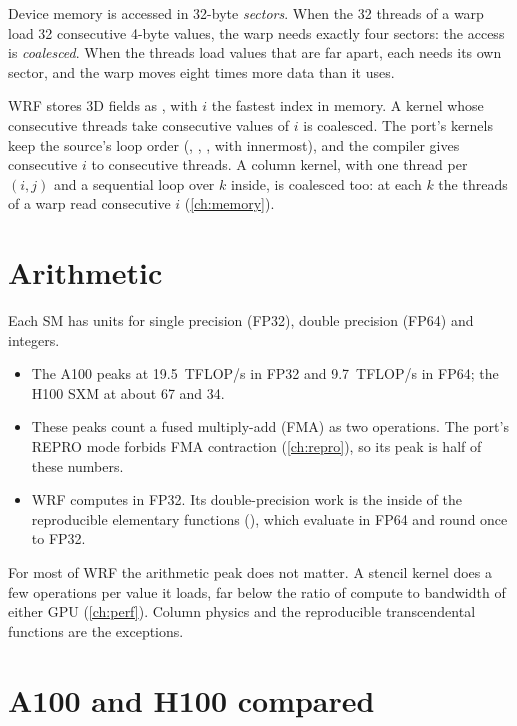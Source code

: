 Device memory is accessed in 32-byte \emph{sectors}. When the 32 threads of a warp load 32 consecutive 4-byte
values, the warp needs exactly four sectors: the access is \emph{coalesced}. When the threads load values that are
far apart, each needs its own sector, and the warp moves eight times more data than it uses.

WRF stores 3D fields as , with $i$ the fastest index in memory. A kernel whose consecutive threads
take consecutive values of $i$ is coalesced. The port's kernels keep the source's loop order (, ,
, with  innermost), and the compiler gives consecutive $i$ to consecutive threads. A column kernel,
with one thread per $(i,j)$ and a sequential loop over $k$ inside, is coalesced too: at each $k$ the threads of a warp
read consecutive $i$ (\cref{ch:memory}).

\section{Arithmetic}

Each SM has units for single precision (FP32), double precision (FP64) and integers.
\begin{itemize}
  \item The A100 peaks at 19.5~TFLOP/s in FP32 and 9.7~TFLOP/s in FP64; the H100 SXM at about 67 and 34.
  \item These peaks count a fused multiply-add (FMA) as two operations. The port's REPRO mode forbids FMA
    contraction (\cref{ch:repro}), so its peak is half of these numbers.
  \item WRF computes in FP32. Its double-precision work is the inside of the reproducible elementary functions
    (), which evaluate in FP64 and round once to FP32.
\end{itemize}
For most of WRF the arithmetic peak does not matter. A stencil kernel does a few operations per value it loads, far
below the ratio of compute to bandwidth of either GPU (\cref{ch:perf}). Column physics and the reproducible
transcendental functions are the exceptions.

\section{A100 and H100 compared}

